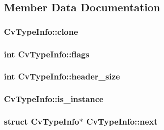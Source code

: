 \subsection{Member Data Documentation}
\hypertarget{structCvTypeInfo_a7f5564410d8178631ae0ea534a052f73}{
\subsubsection[{clone}]{ Cv\-Type\-Info\-::clone}}\label{structCvTypeInfo_a7f5564410d8178631ae0ea534a052f73}
\hypertarget{structCvTypeInfo_ae68f124ef51d1c22341f3e4f136e6f3c}{
\subsubsection[{flags}]{\setlength{\rightskip}{0pt plus 5cm}int Cv\-Type\-Info\-::flags}}\label{structCvTypeInfo_ae68f124ef51d1c22341f3e4f136e6f3c}
\hypertarget{structCvTypeInfo_a5a0375b03a8270afe60c0f9a98429498}{
\subsubsection[{header\-\_\-size}]{\setlength{\rightskip}{0pt plus 5cm}int Cv\-Type\-Info\-::header\-\_\-size}}\label{structCvTypeInfo_a5a0375b03a8270afe60c0f9a98429498}
\hypertarget{structCvTypeInfo_af20737be287e6e40a641d88799b6e138}{
\subsubsection[{is\-\_\-instance}]{ Cv\-Type\-Info\-::is\-\_\-instance}}\label{structCvTypeInfo_af20737be287e6e40a641d88799b6e138}
\hypertarget{structCvTypeInfo_a155be5ea57dea17be45e3558159ef9e9}{
\subsubsection[{next}]{\setlength{\rightskip}{0pt plus 5cm}struct {\bf Cv\-Type\-Info}$\ast$ Cv\-Type\-Info\-::next}}\label{structCvTypeInfo_a155be5ea57dea17be45e3558159ef9e9}
